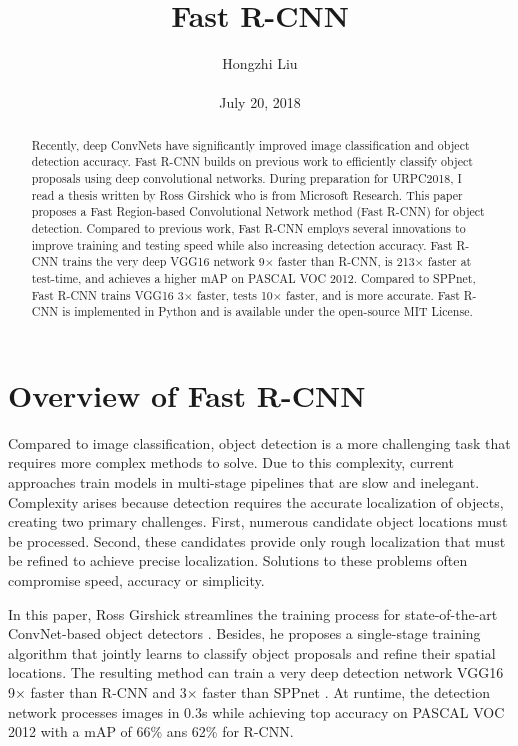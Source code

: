 \documentclass[10pt,twocolumn,letterpaper]{article}
\title{Fast R-CNN}
\author{Hongzhi Liu\\\\
July 20, 2018}
\begin{document}
\maketitle
\begin{abstract}
	Recently, deep ConvNets have significantly improved image classification and object detection accuracy. Fast R-CNN builds on previous work to efficiently classify object proposals using deep convolutional networks. During preparation for URPC2018, I read a thesis written by Ross Girshick who is from Microsoft Research. This paper proposes a Fast Region-based Convolutional Network method (Fast R-CNN) for object detection. Compared to previous work, Fast R-CNN employs several innovations to improve training and testing speed while also increasing detection accuracy. Fast R-CNN trains the very deep VGG16 network 9$\times$ faster than R-CNN, is 213$\times$ faster at test-time, and achieves a higher mAP on PASCAL VOC 2012. Compared to SPPnet, Fast R-CNN trains VGG16 3$\times$ faster, tests 10$\times$ faster, and is more accurate. Fast R-CNN is implemented in Python and is available under the open-source MIT License.
\end{abstract}

\section{Overview of Fast R-CNN}

Compared to image classification, object detection is a more challenging task that requires more complex methods to solve. Due to this complexity, current approaches \cite{rich2104,He2014Spatial} train models in multi-stage pipelines that are slow and inelegant. Complexity arises because detection requires the accurate localization of objects, creating two primary challenges. First, numerous candidate object locations must be processed. Second, these candidates provide only rough localization that must be refined to achieve precise localization. Solutions to these problems often compromise speed, accuracy or simplicity.

In this paper, Ross Girshick streamlines the training process for state-of-the-art ConvNet-based object detectors \cite{Girshick2015Fast}. Besides, he proposes a single-stage training algorithm that jointly learns to classify object proposals and refine their spatial locations. The resulting method can train a very deep detection network VGG16 \cite{Simonyan2014Very} 9$\times$ faster than R-CNN \cite{rich2104} and 3$\times$ faster than SPPnet \cite{He2014Spatial}. At runtime, the detection network processes images in 0.3s while achieving top accuracy on PASCAL VOC 2012 \cite{Everingham2010The} with a mAP of 66\% ans 62\% for R-CNN.
\end{document}

